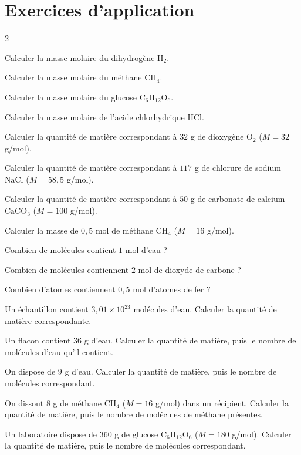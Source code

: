 \section{Exercices d'application}
\begin{multicols}{2}

\exo{} Calculer la masse molaire du dihydrogène $\mathrm{H_2}$.

\exo{} Calculer la masse molaire du méthane $\mathrm{CH_4}$.

\exo{} Calculer la masse molaire du glucose $\mathrm{C_6H_{12}O_6}$.

\exo{} Calculer la masse molaire de l'acide chlorhydrique $\mathrm{HCl}$.

\exo{} Calculer la quantité de matière correspondant à $32$ g de dioxygène
$\mathrm{O_2}$ ($M=32$ g/mol).

\exo{} Calculer la quantité de matière correspondant à $117$ g de chlorure de
sodium $\mathrm{NaCl}$ ($M=58{,}5$ g/mol).

\exo{} Calculer la quantité de matière correspondant à $50$ g de carbonate de
calcium $\mathrm{CaCO_3}$ ($M=100$ g/mol).

\exo{} Calculer la masse de $0{,}5$ mol de méthane $\mathrm{CH_4}$ ($M=16$
g/mol).

\exo{} Combien de molécules contient $1$ mol d'eau ?

\exo{} Combien de molécules contiennent $2$ mol de dioxyde de carbone ?

\exo{} Combien d'atomes contiennent $0{,}5$ mol d'atomes de fer ?

\exo{} Un échantillon contient $3{,}01\times10^{23}$ molécules d'eau. Calculer la
quantité de matière correspondante.

\exo{} Un flacon contient $36$ g d'eau. Calculer la quantité de matière, puis le
nombre de molécules d'eau qu'il contient.

\exo{} On dispose de $9$ g d'eau. Calculer la quantité de matière, puis le nombre
de molécules correspondant.

\exo{} On dissout $8$ g de méthane $\mathrm{CH_4}$ ($M=16$ g/mol) dans un
récipient. Calculer la quantité de matière, puis le nombre de molécules de méthane
présentes.

\exo{} Un laboratoire dispose de $360$ g de glucose $\mathrm{C_6H_{12}O_6}$
($M=180$ g/mol). Calculer la quantité de matière, puis le nombre de molécules
correspondant.

\end{multicols}

